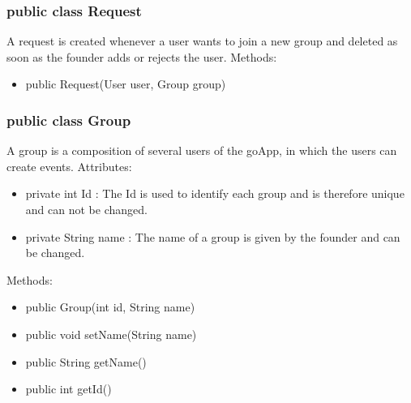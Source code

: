 	\subsubsection{public class Request}
	A request is created whenever a user wants to join a new group and deleted as soon as the founder adds or rejects the user.
	\newline
	Methods: 
	\begin{itemize}
	\item public Request(User user, Group group)
	\end{itemize}
	
	\subsubsection{public class Group}
	A group is a composition of several users of the goApp, in which the users can create events.
	\newline Attributes:
	\begin{itemize}
	\item private int Id : The Id is used to identify each group and is therefore unique and can not be changed.
	\item private String name : The name of a group is given by the founder and can be changed.
	\end{itemize}
	Methods:
	\begin{itemize}
	\item public Group(int id, String name)
	\item public void setName(String name)
	\item public String getName()
	\item public int getId()
	\end{itemize}

